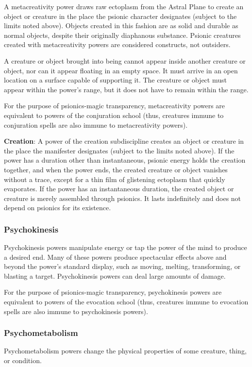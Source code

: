 A metacreativity power draws raw ectoplasm from the Astral Plane to create an object or creature in the place the psionic character designates (subject to the limits noted above). Objects created in this fashion are as solid and durable as normal objects, despite their originally diaphanous substance. Psionic creatures created with metacreativity powers are considered constructs, not outsiders.

A creature or object brought into being cannot appear inside another creature or object, nor can it appear floating in an empty space. It must arrive in an open location on a surface capable of supporting it. The creature or object must appear within the power's range, but it does not have to remain within the range.

For the purpose of psionics-magic transparency, metacreativity powers are equivalent to powers of the conjuration school (thus, creatures immune to conjuration spells are also immune to metacreativity powers).

\textbf{Creation}: A power of the creation subdiscipline creates an object or creature in the place the manifester designates (subject to the limits noted above). If the power has a duration other than instantaneous, psionic energy holds the creation together, and when the power ends, the created creature or object vanishes without a trace, except for a thin film of glistening ectoplasm that quickly evaporates. If the power has an instantaneous duration, the created object or creature is merely assembled through psionics. It lasts indefinitely and does not depend on psionics for its existence.

\subsubsection{Psychokinesis}
Psychokinesis powers manipulate energy or tap the power of the mind to produce a desired end. Many of these powers produce spectacular effects above and beyond the power's standard display, such as moving, melting, transforming, or blasting a target. Psychokinesis powers can deal large amounts of damage.

For the purpose of psionics-magic transparency, psychokinesis powers are equivalent to powers of the evocation school (thus, creatures immune to evocation spells are also immune to psychokinesis powers).

\subsubsection{Psychometabolism}
Psychometabolism powers change the physical properties of some creature, thing, or condition.

